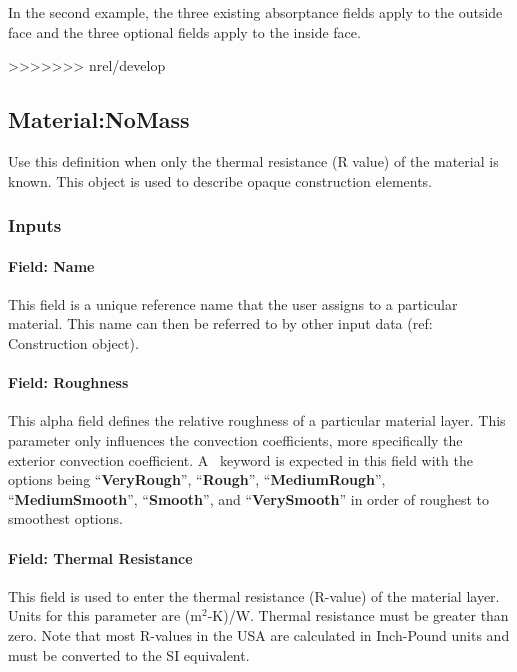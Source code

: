 In the second example, the three existing absorptance fields apply to the outside face and the three optional fields apply to the inside face.

>>>>>>> nrel/develop
\subsection{Material:NoMass}\label{materialnomass}

Use this definition when only the thermal resistance (R value) of the material is known. This object is used to describe opaque construction elements.

\subsubsection{Inputs}\label{inputs-1-043}

\paragraph{Field: Name}\label{field-name-1-042}

This field is a unique reference name that the user assigns to a particular material. This name can then be referred to by other input data (ref: Construction object).

\paragraph{Field: Roughness}\label{field-roughness-1}

This alpha field defines the relative roughness of a particular material layer. This parameter only influences the convection coefficients, more specifically the exterior convection coefficient. A~ keyword is expected in this field with the options being ``\textbf{VeryRough}'', ``\textbf{Rough}'', ``\textbf{MediumRough}'', ``\textbf{MediumSmooth}'', ``\textbf{Smooth}'', and ``\textbf{VerySmooth}'' in order of roughest to smoothest options.

\paragraph{Field: Thermal Resistance}\label{field-thermal-resistance}

This field is used to enter the thermal resistance (R-value) of the material layer. Units for this parameter are (m\(^{2}\)-K)/W. Thermal resistance must be greater than zero. Note that most R-values in the USA are calculated in Inch-Pound units and must be converted to the SI equivalent.

